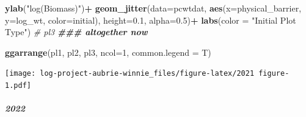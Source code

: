 \documentclass[
]{article}
\newenvironment{Shaded}{\begin{snugshade}}{\end{snugshade}}
\newcommand{\AttributeTok}[1]{\textcolor[rgb]{0.13,0.29,0.53}{#1}}
\newcommand{\CommentTok}[1]{\textcolor[rgb]{0.56,0.35,0.01}{\textit{#1}}}
\newcommand{\DecValTok}[1]{\textcolor[rgb]{0.00,0.00,0.81}{#1}}
\newcommand{\DocumentationTok}[1]{\textcolor[rgb]{0.56,0.35,0.01}{\textbf{\textit{#1}}}}
\newcommand{\FloatTok}[1]{\textcolor[rgb]{0.00,0.00,0.81}{#1}}
\newcommand{\FunctionTok}[1]{\textcolor[rgb]{0.13,0.29,0.53}{\textbf{#1}}}
\newcommand{\NormalTok}[1]{#1}
\newcommand{\OtherTok}[1]{\textcolor[rgb]{0.56,0.35,0.01}{#1}}
\newcommand{\SpecialCharTok}[1]{\textcolor[rgb]{0.81,0.36,0.00}{\textbf{#1}}}
\newcommand{\StringTok}[1]{\textcolor[rgb]{0.31,0.60,0.02}{#1}}
\begin{document}
\begin{Shaded}
\begin{Highlighting}[]
  \FunctionTok{ylab}\NormalTok{(}\StringTok{"log(Biomass)"}\NormalTok{)}\SpecialCharTok{+}
  \FunctionTok{geom\_jitter}\NormalTok{(}\AttributeTok{data=}\NormalTok{pcwtdat,}
              \FunctionTok{aes}\NormalTok{(}\AttributeTok{x=}\NormalTok{physical\_barrier, }\AttributeTok{y=}\NormalTok{log\_wt, }\AttributeTok{color=}\NormalTok{initial), }
              \AttributeTok{height=}\FloatTok{0.1}\NormalTok{,}
              \AttributeTok{alpha=}\FloatTok{0.5}\NormalTok{)}\SpecialCharTok{+}
  \FunctionTok{labs}\NormalTok{(}\AttributeTok{color =} \StringTok{"Initial Plot Type"}\NormalTok{)}
\CommentTok{\# pl3}
\DocumentationTok{\#\#\# altogether now}
\end{Highlighting}
\end{Shaded}

\begin{Shaded}
\begin{Highlighting}[]
\FunctionTok{ggarrange}\NormalTok{(pl1, pl2, pl3, }\AttributeTok{ncol=}\DecValTok{1}\NormalTok{, }\AttributeTok{common.legend =}\NormalTok{ T)}
\end{Highlighting}
\end{Shaded}

\texttt{[image: log-project-aubrie-winnie\_files/figure-latex/2021 figure-1.pdf]}

\hypertarget{section-1}{%
\subparagraph{\texorpdfstring{\textbf{2022}}{2022}}\label{section-1}}

\begin{Shaded}
\end{Shaded}
\end{document}
